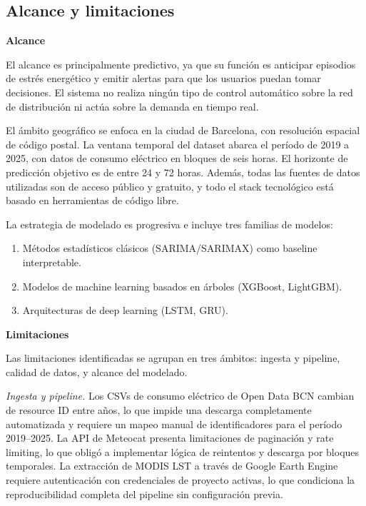 \documentclass[12pt, a4paper]{article}
\begin{document}
\subsection{Alcance y limitaciones}

\textbf{Alcance}

El alcance es principalmente predictivo, ya que su función es anticipar episodios de estrés energético y emitir alertas para que los usuarios puedan tomar decisiones. El sistema no realiza ningún tipo de control automático sobre la red de distribución ni actúa sobre la demanda en tiempo real.

El ámbito geográfico se enfoca en la ciudad de Barcelona, con resolución espacial de código postal. La ventana temporal del dataset abarca el período de 2019 a 2025, con datos de consumo eléctrico en bloques de seis horas. El horizonte de predicción objetivo es de entre 24 y 72 horas. Además, todas las fuentes de datos utilizadas son de acceso público y gratuito, y todo el stack tecnológico está basado en herramientas de código libre.

La estrategia de modelado es progresiva e incluye tres familias de modelos:
\begin{enumerate}[label=\arabic*.]
    \item Métodos estadísticos clásicos (SARIMA/SARIMAX) como baseline interpretable.
    \item Modelos de machine learning basados en árboles (XGBoost, LightGBM).
    \item Arquitecturas de deep learning (LSTM, GRU).
\end{enumerate}

\textbf{Limitaciones}

Las limitaciones identificadas se agrupan en tres ámbitos: ingesta y pipeline, calidad de datos, y alcance del modelado.

\textit{Ingesta y pipeline.} Los CSVs de consumo eléctrico de Open Data BCN cambian de resource ID entre años, lo que impide una descarga completamente automatizada y requiere un mapeo manual de identificadores para el período 2019--2025. La API de Meteocat presenta limitaciones de paginación y rate limiting, lo que obligó a implementar lógica de reintentos y descarga por bloques temporales. La extracción de MODIS LST a través de Google Earth Engine requiere autenticación con credenciales de proyecto activas, lo que condiciona la reproducibilidad completa del pipeline sin configuración previa.
\end{document}
